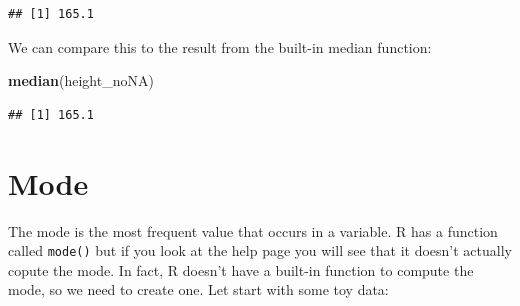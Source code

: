 \documentclass[12pt,]{book}
\newenvironment{Shaded}{\begin{snugshade}}{\end{snugshade}}
\newcommand{\CommentTok}[1]{\textcolor[rgb]{0.56,0.35,0.01}{\textit{#1}}}
\newcommand{\ControlFlowTok}[1]{\textcolor[rgb]{0.13,0.29,0.53}{\textbf{#1}}}
\newcommand{\DecValTok}[1]{\textcolor[rgb]{0.00,0.00,0.81}{#1}}
\newcommand{\KeywordTok}[1]{\textcolor[rgb]{0.13,0.29,0.53}{\textbf{#1}}}
\newcommand{\NormalTok}[1]{#1}
\newcommand{\OperatorTok}[1]{\textcolor[rgb]{0.81,0.36,0.00}{\textbf{#1}}}
\newcommand{\StringTok}[1]{\textcolor[rgb]{0.31,0.60,0.02}{#1}}
\begin{document}
\begin{Shaded}
\end{Shaded}

\begin{verbatim}
## [1] 165.1
\end{verbatim}

We can compare this to the result from the built-in median function:

\begin{Shaded}
\begin{Highlighting}[]
\KeywordTok{median}\NormalTok{(height_noNA)}
\end{Highlighting}
\end{Shaded}

\begin{verbatim}
## [1] 165.1
\end{verbatim}

\hypertarget{mode}{%
\section{Mode}\label{mode}}

The mode is the most frequent value that occurs in a variable. R has a function called \texttt{mode()} but if you look at the help page you will see that it doesn't actually copute the mode. In fact, R doesn't have a built-in function to compute the mode, so we need to create one. Let start with some toy data:
\end{document}
